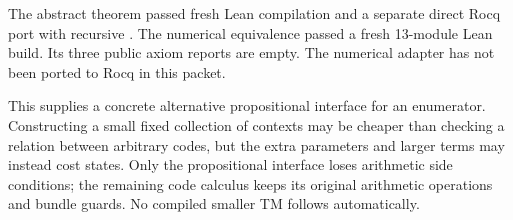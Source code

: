 The abstract theorem passed fresh Lean compilation and a separate direct Rocq port with recursive . The numerical equivalence passed a fresh 13-module Lean build. Its three public axiom reports are empty. The numerical adapter has not been ported to Rocq in this packet.

This supplies a concrete alternative propositional interface for an enumerator. Constructing a small fixed collection of contexts may be cheaper than checking a relation between arbitrary codes, but the extra parameters and larger terms may instead cost states. Only the propositional interface loses arithmetic side conditions; the remaining code calculus keeps its original arithmetic operations and bundle guards. No compiled smaller TM follows automatically.
